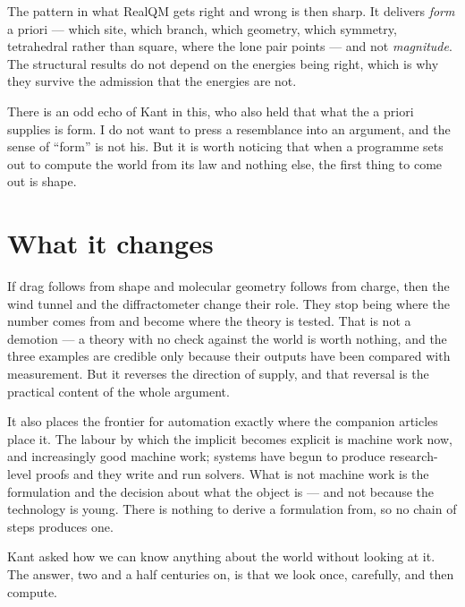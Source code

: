 \documentclass[11pt]{article}
\begin{document}
The pattern in what RealQM gets right and wrong is then sharp. It delivers \emph{form} a priori ---
which site, which branch, which geometry, which symmetry, tetrahedral rather than square, where the
lone pair points --- and not \emph{magnitude}. The structural results do not depend on the energies
being right, which is why they survive the admission that the energies are not.

There is an odd echo of Kant in this, who also held that what the a priori supplies is form. I do
not want to press a resemblance into an argument, and the sense of ``form'' is not his. But it is
worth noticing that when a programme sets out to compute the world from its law and nothing else,
the first thing to come out is shape.

\section{What it changes}\label{sec:changes}

If drag follows from shape and molecular geometry follows from charge, then the wind tunnel and the
diffractometer change their role. They stop being where the number comes from and become where the
theory is tested. That is not a demotion --- a theory with no check against the world is worth
nothing, and the three examples are credible only because their outputs have been compared with
measurement. But it reverses the direction of supply, and that reversal is the practical content of
the whole argument.

It also places the frontier for automation exactly where the companion articles place it. The labour
by which the implicit becomes explicit is machine work now, and increasingly good machine work;
systems have begun to produce research-level proofs and they write and run solvers. What is not machine
work is the formulation and the decision about what the object is ---
and not because the technology is young. There is nothing to derive a formulation from, so no chain
of steps produces one.

Kant asked how we can know anything about the world without looking at it. The answer, two and a
half centuries on, is that we look once, carefully, and then compute.
\end{document}
